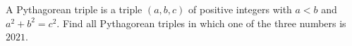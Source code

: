 A Pythagorean triple is a triple $(a,b,c)$ of positive integers with $a<b$ and $a^2+b^2=c^2$. Find all Pythagorean triples in which one of the three numbers is $2021$.

